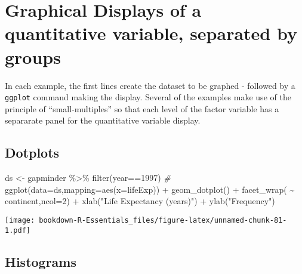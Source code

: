 \documentclass[
]{book}
\newenvironment{Shaded}{\begin{snugshade}}{\end{snugshade}}
\newcommand{\AttributeTok}[1]{\textcolor[rgb]{0.77,0.63,0.00}{#1}}
\newcommand{\CommentTok}[1]{\textcolor[rgb]{0.56,0.35,0.01}{\textit{#1}}}
\newcommand{\DecValTok}[1]{\textcolor[rgb]{0.00,0.00,0.81}{#1}}
\newcommand{\FunctionTok}[1]{\textcolor[rgb]{0.00,0.00,0.00}{#1}}
\newcommand{\NormalTok}[1]{#1}
\newcommand{\OtherTok}[1]{\textcolor[rgb]{0.56,0.35,0.01}{#1}}
\newcommand{\SpecialCharTok}[1]{\textcolor[rgb]{0.00,0.00,0.00}{#1}}
\newcommand{\StringTok}[1]{\textcolor[rgb]{0.31,0.60,0.02}{#1}}
\begin{document}
\hypertarget{graphical-displays-of-a-quantitative-variable-separated-by-groups}{%
\section{Graphical Displays of a quantitative variable, separated by groups}\label{graphical-displays-of-a-quantitative-variable-separated-by-groups}}

In each example, the first lines create the dataset to be graphed - followed by a \texttt{ggplot} command making the display. Several of the examples make use of the principle of ``small-multiples'' so that each level of the factor variable has a separarate panel for the quantitative variable display.

\hypertarget{dotplots}{%
\subsection{Dotplots}\label{dotplots}}

\begin{Shaded}
\begin{Highlighting}[]
\NormalTok{ds }\OtherTok{\textless{}{-}}\NormalTok{ gapminder }\SpecialCharTok{\%\textgreater{}\%} \FunctionTok{filter}\NormalTok{(year}\SpecialCharTok{==}\DecValTok{1997}\NormalTok{) }
\CommentTok{\#}
\FunctionTok{ggplot}\NormalTok{(}\AttributeTok{data=}\NormalTok{ds,}\AttributeTok{mapping=}\FunctionTok{aes}\NormalTok{(}\AttributeTok{x=}\NormalTok{lifeExp)) }\SpecialCharTok{+} 
  \FunctionTok{geom\_dotplot}\NormalTok{() }\SpecialCharTok{+} 
  \FunctionTok{facet\_wrap}\NormalTok{( }\SpecialCharTok{\textasciitilde{}}\NormalTok{ continent,}\AttributeTok{ncol=}\DecValTok{2}\NormalTok{) }\SpecialCharTok{+} 
  \FunctionTok{xlab}\NormalTok{(}\StringTok{"Life Expectancy (years)"}\NormalTok{) }\SpecialCharTok{+}
  \FunctionTok{ylab}\NormalTok{(}\StringTok{"Frequency"}\NormalTok{)}
\end{Highlighting}
\end{Shaded}

\texttt{[image: bookdown-R-Essentials\_files/figure-latex/unnamed-chunk-81-1.pdf]}

\hypertarget{histograms}{%
\subsection{Histograms}\label{histograms}}
\end{document}
